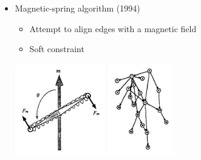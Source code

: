 \begin{frame}
  \frametitle{\insertsubsection}
  \begin{itemize}
    \item Magnetic-spring algorithm (1994) \begin{itemize}
      \item Attempt to align edges with a magnetic field
      \item Soft constraint
    \end{itemize}
    \vspace{0.5cm}
    \centering
    \includegraphics[height=4cm,natwidth=764,natheight=780]{Resources/MagneticSprings.png}
    \hspace{0.5cm}
    \includegraphics[height=4cm,natwidth=506,natheight=710]{Resources/MagneticDrawing.png}
  \end{itemize}
\end{frame}

